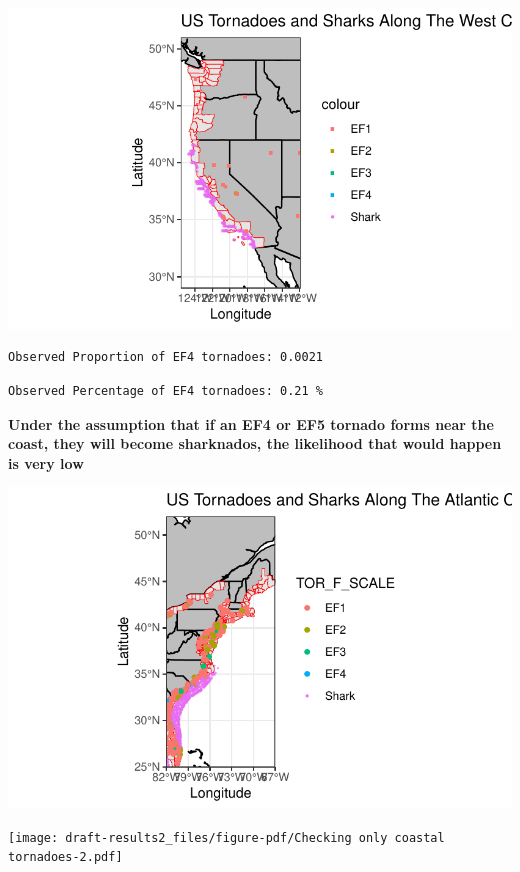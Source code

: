 \documentclass[
  letterpaper,
  DIV=11,
  numbers=noendperiod]{scrreprt}
\begin{document}
\includegraphics{draft-results2_files/figure-pdf/Path of Tornadoes in the US-5.pdf}

\begin{verbatim}
Observed Proportion of EF4 tornadoes: 0.0021 
\end{verbatim}

\begin{verbatim}
Observed Percentage of EF4 tornadoes: 0.21 %
\end{verbatim}

\textbf{Under the assumption that if an EF4 or EF5 tornado forms near
the coast, they will become sharknados, the likelihood that would happen
is very low}

\includegraphics{draft-results2_files/figure-pdf/Checking only coastal tornadoes-1.pdf}

\texttt{[image: draft-results2\_files/figure-pdf/Checking only coastal tornadoes-2.pdf]}
\end{document}
